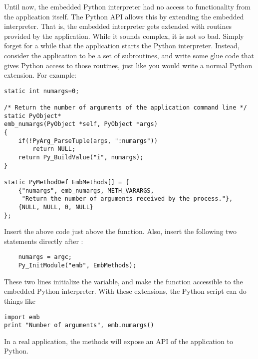 Until now, the embedded Python interpreter had no access to
functionality from the application itself.  The Python API allows this
by extending the embedded interpreter.  That is, the embedded
interpreter gets extended with routines provided by the application.
While it sounds complex, it is not so bad.  Simply forget for a while
that the application starts the Python interpreter.  Instead, consider
the application to be a set of subroutines, and write some glue code
that gives Python access to those routines, just like you would write
a normal Python extension.  For example:

\begin{verbatim}
static int numargs=0;

/* Return the number of arguments of the application command line */
static PyObject*
emb_numargs(PyObject *self, PyObject *args)
{
    if(!PyArg_ParseTuple(args, ":numargs"))
        return NULL;
    return Py_BuildValue("i", numargs);
}

static PyMethodDef EmbMethods[] = {
    {"numargs", emb_numargs, METH_VARARGS,
     "Return the number of arguments received by the process."},
    {NULL, NULL, 0, NULL}
};
\end{verbatim}

Insert the above code just above the  function.
Also, insert the following two statements directly after
:

\begin{verbatim}
    numargs = argc;
    Py_InitModule("emb", EmbMethods);
\end{verbatim}

These two lines initialize the  variable, and make the
 function accessible to the embedded Python
interpreter.  With these extensions, the Python script can do things
like

\begin{verbatim}
import emb
print "Number of arguments", emb.numargs()
\end{verbatim}

In a real application, the methods will expose an API of the
application to Python.


%


